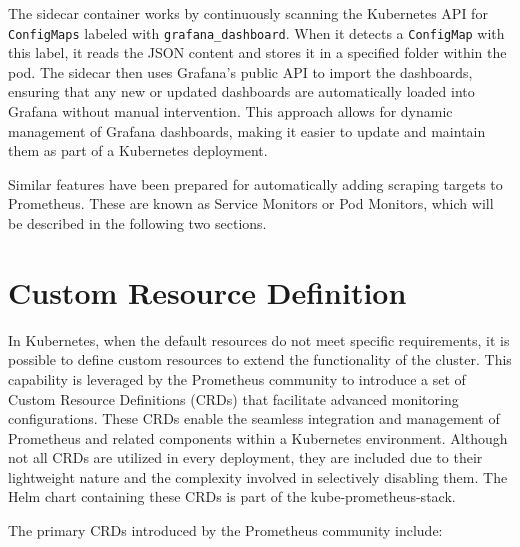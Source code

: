 The sidecar container works by continuously scanning the Kubernetes API for \texttt{ConfigMaps} labeled with \texttt{grafana\_dashboard}. When it detects a \texttt{ConfigMap} with this label, it reads the JSON content and stores it in a specified folder within the pod. The sidecar then uses Grafana's public API to import the dashboards, ensuring that any new or updated dashboards are automatically loaded into Grafana without manual intervention. This approach allows for dynamic management of Grafana dashboards, making it easier to update and maintain them as part of a Kubernetes deployment.

Similar features have been prepared for automatically adding scraping targets to Prometheus. These are known as Service Monitors or Pod Monitors, which will be described in the following two sections.

\section{Custom Resource Definition}
In Kubernetes, when the default resources do not meet specific requirements, it is possible to define custom resources to extend the functionality of the cluster. This capability is leveraged by the Prometheus community to introduce a set of Custom Resource Definitions (CRDs) that facilitate advanced monitoring configurations. These CRDs enable the seamless integration and management of Prometheus and related components within a Kubernetes environment. Although not all CRDs are utilized in every deployment, they are included due to their lightweight nature and the complexity involved in selectively disabling them. The Helm chart containing these CRDs is part of the kube-prometheus-stack.

The primary CRDs introduced by the Prometheus community include:

